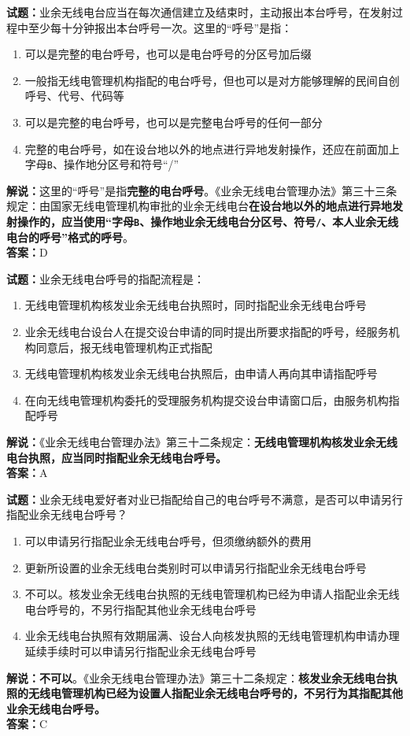 \documentclass{ctexbook}
\begin{document}
\bigskip

\noindent\textbf{试题：}业余无线电台应当在每次通信建立及结束时，主动报出本台呼号，在发射过程中至少每十分钟报出本台呼号一次。这里的“呼号”是指：
\begin{enumerate}[leftmargin=3em]
  \item 可以是完整的电台呼号，也可以是电台呼号的分区号加后缀
  \item 一般指无线电管理机构指配的电台呼号，但也可以是对方能够理解的民间自创呼号、代号、代码等
  \item 可以是完整的电台呼号，也可以是完整电台呼号的任何一部分
  \item 完整的电台呼号，如在设台地以外的地点进行异地发射操作，还应在前面加上字母\texttt{B}、操作地分区号和符号“/”
\end{enumerate}
\noindent\textbf{解说：}这里的“呼号”是指\textbf{完整的电台呼号}。《业余无线电台管理办法》第三十三条规定：由国家无线电管理机构审批的业余无线电台\textbf{在设台地以外的地点进行异地发射操作的，应当使用“字母\texttt{B}、操作地业余无线电台分区号、符号\texttt{/}、本人业余无线电台的呼号”格式的呼号}。\\\noindent\textbf{答案：}D

\bigskip

\noindent\textbf{试题：}业余无线电台呼号的指配流程是：
\begin{enumerate}[leftmargin=3em]
  \item 无线电管理机构核发业余无线电台执照时，同时指配业余无线电台呼号
  \item 业余无线电台设台人在提交设台申请的同时提出所要求指配的呼号，经服务机构同意后，报无线电管理机构正式指配
  \item 无线电管理机构核发业余无线电台执照后，由申请人再向其申请指配呼号
  \item 在向无线电管理机构委托的受理服务机构提交设台申请窗口后，由服务机构指配呼号
\end{enumerate}
\noindent\textbf{解说：}《业余无线电台管理办法》第三十二条规定：\textbf{无线电管理机构核发业余无线电台执照，应当同时指配业余无线电台呼号。}\\\noindent\textbf{答案：}A

\bigskip

\noindent\textbf{试题：}业余无线电爱好者对业已指配给自己的电台呼号不满意，是否可以申请另行指配业余无线电台呼号？
\begin{enumerate}[leftmargin=3em]
  \item 可以申请另行指配业余无线电台呼号，但须缴纳额外的费用
  \item 更新所设置的业余无线电台类别时可以申请另行指配业余无线电台呼号
  \item 不可以。核发业余无线电台执照的无线电管理机构已经为申请人指配业余无线电台呼号的，不另行指配其他业余无线电台呼号
  \item 业余无线电台执照有效期届满、设台人向核发执照的无线电管理机构申请办理延续手续时可以申请另行指配业余无线电台呼号
\end{enumerate}
\textbf{解说：不可以}。《业余无线电台管理办法》第三十二条规定：\textbf{核发业余无线电台执照的无线电管理机构已经为设置人指配业余无线电台呼号的，不另行为其指配其他业余无线电台呼号。}\\\noindent\textbf{答案：}C
\end{document}

